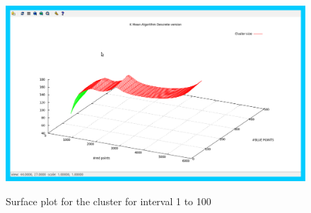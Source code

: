 \documentclass[12pt,a4wide]{report}
\theoremstyle{plain}
\theoremstyle{definition}
\theoremstyle{remark}
\begin{document}
 \begin{figure}[H]
 \caption{Surface plot for the cluster for interval 1 to 100}
  \centering
\scalebox{0.3}
{\includegraphics{avg100d.png}}
\end{figure}
\end{document}
